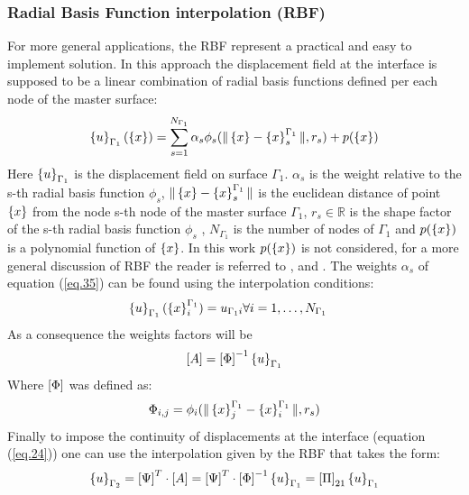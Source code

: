      \subsubsection{Radial Basis Function interpolation (RBF)}\label{sssec332}
     For more general applications, the RBF represent a practical and easy to implement solution. In this approach the displacement field at the interface  is supposed to be a linear combination of radial basis functions defined per each node of the master surface:
     \begin{equation}
     \label{eq.35}
     \left\lbrace{u}\right \rbrace_{\Gamma_1}(\left\lbrace{x}\right \rbrace)=\sum_{s=1}^{N_{\Gamma_1}}\alpha_s\phi_s(\|\left\lbrace{x}\right \rbrace-\left\lbrace{x}\right \rbrace^{\Gamma_1}_s\|,r_s)+p(\left\lbrace{x}\right \rbrace)
     \end{equation}
     Here $\left\lbrace{u}\right \rbrace_{\Gamma_1}$ is the displacement field on surface $\Gamma_1$. $\alpha_s$ is the weight relative to the s-th radial basis function $\phi_s$, $\|\left\lbrace{x}\right \rbrace-\left\lbrace{x}\right \rbrace^{\Gamma_1}_s\| $ is the euclidean distance of point $\left\lbrace{x}\right \rbrace$ from the node s-th node of the master surface $\Gamma_1$, $r_s \in \mathbb{R} $ is the shape factor of the s-th radial basis function $\phi_s$ , $N_{\Gamma_1}$ is the number of nodes of $\Gamma_1$ and $p(\left\lbrace{x}\right \rbrace)$ is a polynomial function of $\left\lbrace{x}\right \rbrace$. In this work $p(\left\lbrace{x}\right \rbrace)$ is not considered, for a more general discussion of RBF the reader is referred to \cite{de2007review} , \cite{beckert2001multivariate} and \cite{smith2000evaluation}. The weights $\alpha_s$ of equation (\ref{eq.35}) can be found using the interpolation conditions:
     \begin{eqnarray}
     \label{eq.36}
     \left\lbrace{u}\right \rbrace_{\Gamma_1}(\left\lbrace{x}\right \rbrace_i^{\Gamma_1})=u_{\Gamma_1 i} & \forall i=1,\dots,N_{\Gamma_1} 
     \end{eqnarray}
     As a consequence the weights factors will be
     \begin{equation}
     \label{eq.37}
     \left[{A}\right]=\left[{\Phi}\right]^{-1}\left\lbrace{u}\right \rbrace_{\Gamma_1}
     \end{equation}
     Where $\left[{\Phi}\right]$ was defined as:
     \begin{equation}
     \label{eq.38}
     \Phi_{i,j}=\phi_i(\|\left\lbrace{x}\right \rbrace^{\Gamma_1}_j-\left\lbrace{x}\right \rbrace^{\Gamma_1}_i\|,r_s)
     \end{equation}
     Finally to impose the continuity of displacements at the interface (equation (\ref{eq.24})) one can use the interpolation given by the RBF that takes the form:
     \begin{equation}
     \label{eq.39}
     \left\lbrace{u}\right \rbrace_{\Gamma_2}=\left[{\Psi}\right]^T\cdot\left[{A}\right]=\left[{\Psi}\right]^T\cdot\left[{\Phi}\right]^{-1}\left\lbrace{u}\right \rbrace_{\Gamma_1}=\left[{\Pi}\right]_{21}\left\lbrace{u}\right \rbrace_{\Gamma_1}
     \end{equation}
